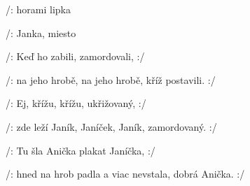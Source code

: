 

\zs
/:  horami
lipka 

/:  Janka,
 
miesto 
\ks

\zs
/: Keď ho zabili,
zamordovali, :/

/: na jeho hrobě,
na jeho hrobě,
kříž postavili. :/
\ks

\zs
/: Ej, křížu, křížu,
ukřižovaný, :/

/: zde leží Janík,
Janíček, Janík,
zamordovaný. :/
\ks

\zs
/: Tu šla Anička
plakat Janíčka, :/

/: hned na hrob padla
a viac nevstala,
dobrá Anička. :/
\ks

\kp







